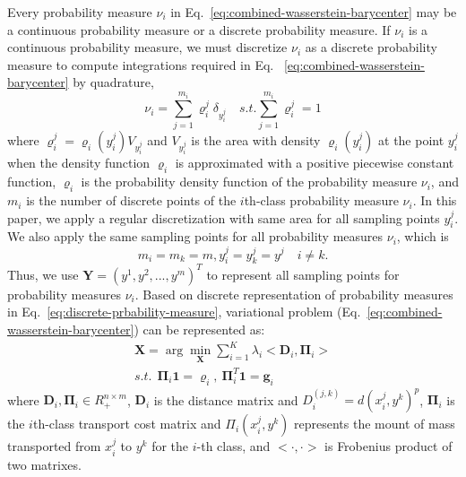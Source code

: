 Every probability measure $\nu_i$ in Eq.~\ref{eq:combined-wasserstein-barycenter} may be a continuous probability measure or a discrete probability measure.
If $\nu_i$ is a continuous probability measure,
we must discretize  $\nu_i$ as a discrete probability measure
to compute integrations required in Eq. ~\ref{eq:combined-wasserstein-barycenter} by quadrature,
\begin{equation}\label{eq:discrete-prbability-measure}
\nu_i=\sum\limits_{j=1}^{m_i}\varrho_i^j\delta_{y_i^j} \quad s.t. \sum\limits_{j=1}^{m_i}\varrho_i^j=1
\end{equation}
where $\varrho_i^j=\varrho_i(y_i^j)V_{y_i^j}$
and $V_{y_i^j}$ is the area with density $\varrho_i(y_i^j)$ at the point $y_i^j$ when the density function
$\varrho_i$ is approximated with a positive piecewise constant function,
$\varrho_i$ is the probability density function of the probability measure $\nu_i$,
and $m_i$ is the number of discrete points of the $i$th-class probability measure $\nu_i$.
In this paper,
we apply a regular discretization with same area for all sampling points $y_i^j$.
We also apply the same sampling points for all probability measures $\nu_i$,
which is
\begin{equation*}
m_i=m_k=m, y_i^j=y_k^j=y^j \quad{i\neq k}.
\end{equation*}
Thus, we use $\mathbf{Y}=(y^1,y^2,...,y^m)^T$ to represent all sampling points for probability measures $\nu_i$.
Based on discrete representation of probability measures in Eq.~\ref{eq:discrete-prbability-measure},
variational problem (Eq.~\ref{eq:combined-wasserstein-barycenter}) can be represented as:
\begin{equation}\label{eq:discrete-multi-problem}
  \begin{aligned}
  \mathbf{X}=\arg\min\limits_{\mathbf{X}}\sum\limits_{i=1}^K\lambda_i<\mathbf{D}_i,\mathbf{\Pi}_i> \\
    s.t.\ \ \mathbf{\Pi}_i\mathbf{1}=\mathbf{\varrho}_i,\ \mathbf{\Pi}_i^T\mathbf{1}=\mathbf{g}_i
  \end{aligned}
\end{equation}
where
 $\mathbf{D}_i,\mathbf{\Pi}_i\in R_+^{n\times m}$,
 $\mathbf{D}_i$ is the distance matrix and $D_i^{(j,k)}=d(x_i^j,y^k)^p$,
 $\mathbf{\Pi}_i$ is the $i$th-class transport cost matrix and $\Pi_i(x_i^j,y^k)$ represents the mount of mass transported from $x_i^j$ to $y^k$ for the $i$-th class,
 and $<\cdot,\cdot>$ is Frobenius product of two matrixes.

